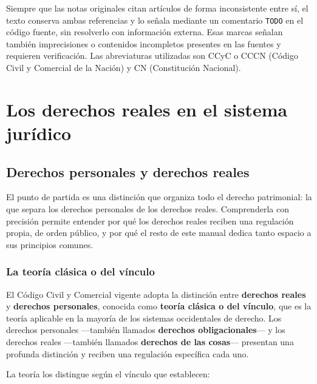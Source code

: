 \documentclass[12pt,oneside]{book}
\begin{document}
\begin{nota}
Siempre que las notas originales citan artículos de forma inconsistente entre sí, el texto conserva ambas referencias y lo señala mediante un comentario \texttt{TODO} en el código fuente, sin resolverlo con información externa. Esas marcas señalan también imprecisiones o contenidos incompletos presentes en las fuentes y requieren verificación. Las abreviaturas utilizadas son CCyC o CCCN (Código Civil y Comercial de la Nación) y CN (Constitución Nacional).
\end{nota}

\part{Los derechos reales en el sistema jurídico}

\chapter[Derechos personales y derechos reales]{Derechos personales y derechos reales}\label{cap:dp-dr}

El punto de partida es una distinción que organiza todo el derecho patrimonial: la que separa los derechos personales de los derechos reales. Comprenderla con precisión permite entender por qué los derechos reales reciben una regulación propia, de orden público, y por qué el resto de este manual dedica tanto espacio a sus principios comunes.

\section{La teoría clásica o del vínculo}

El Código Civil y Comercial vigente adopta la distinción entre \textbf{derechos reales} y \textbf{derechos personales}, conocida como \textbf{teoría clásica o del vínculo}, que es la teoría aplicable en la mayoría de los sistemas occidentales de derecho. Los derechos personales ---también llamados \textbf{derechos obligacionales}--- y los derechos reales ---también llamados \textbf{derechos de las cosas}--- presentan una profunda distinción y reciben una regulación específica cada uno.

La teoría los distingue según el vínculo que establecen:
\end{document}
